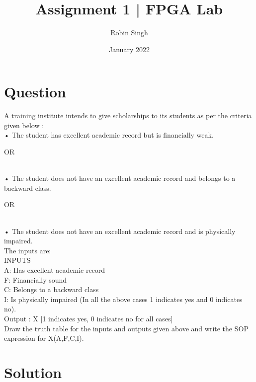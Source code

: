 \documentclass{article}
\title{Assignment 1  | FPGA Lab}
\author{Robin Singh}
\date{January 2022}
\begin{document}
\maketitle

\section{Question}

A training institute intends to give scholarships to its students as per the criteria
given below :\\
• The student has excellent academic record but is financially weak.\\
                        \begin{center}     OR \end{center}  \\
• The student does not have an excellent academic record and belongs to
a backward class.\\
                             \begin{center}     OR \end{center}  \\
• The student does not have an excellent academic record and is
physically impaired.\\
The inputs are:\\
INPUTS\\
A: Has excellent academic record\\
F: Financially sound\\
C: Belongs to a backward class\\
I: Is physically impaired
(In all the above cases 1 indicates yes and 0 indicates no).\\
Output : X [1 indicates yes, 0 indicates no for all cases]\\
Draw the truth table for the inputs and outputs given above and write the SOP
expression for X(A,F,C,I).

\section{Solution}
\end{document}

